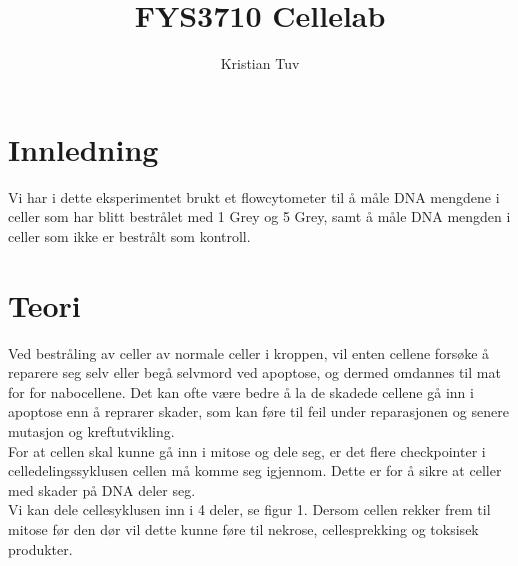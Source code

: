 \documentclass[a4paper, 12pt]{article}
\begin{document}
\author{Kristian Tuv}
\title{FYS3710  Cellelab}
\maketitle

\section{Innledning}
Vi har i dette eksperimentet brukt et flowcytometer til å måle DNA mengdene i celler som har blitt bestrålet med 1 Grey og 5 Grey, samt å måle DNA mengden i celler som ikke er bestrålt som kontroll.

\section{Teori}
Ved bestråling av celler av normale celler i kroppen, vil enten cellene forsøke å reparere seg selv eller begå selvmord ved apoptose, og dermed omdannes til mat for for nabocellene. Det kan ofte være bedre å la de skadede cellene gå inn i apoptose enn å reprarer skader, som kan føre til feil under reparasjonen og senere mutasjon og kreftutvikling.\\
For at cellen skal kunne gå inn i mitose og dele seg, er det flere checkpointer i celledelingssyklusen cellen må komme seg igjennom. Dette er for å sikre at celler med skader på DNA deler seg.\\
Vi kan dele cellesyklusen inn i 4 deler, se figur 1. Dersom cellen rekker frem til mitose før den dør vil dette kunne føre til nekrose, cellesprekking og toksisek produkter. \\
\end{document}
